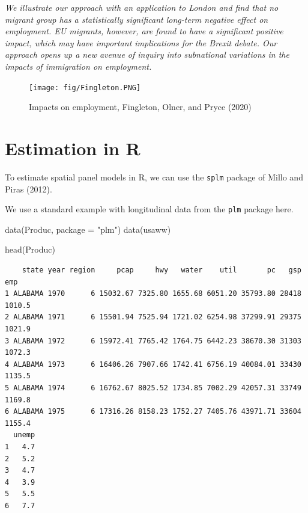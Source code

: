 \documentclass[
  letterpaper,
  DIV=11,
  numbers=noendperiod]{scrreprt}
\newenvironment{Shaded}{\begin{snugshade}}{\end{snugshade}}
\newcommand{\AttributeTok}[1]{\textcolor[rgb]{0.40,0.45,0.13}{#1}}
\newcommand{\FunctionTok}[1]{\textcolor[rgb]{0.28,0.35,0.67}{#1}}
\newcommand{\NormalTok}[1]{\textcolor[rgb]{0.00,0.23,0.31}{#1}}
\newcommand{\StringTok}[1]{\textcolor[rgb]{0.13,0.47,0.30}{#1}}
\begin{document}
\emph{We illustrate our approach with an application to London and find
that no migrant group has a statistically significant long-term negative
effect on employment. EU migrants, however, are found to have a
significant positive impact, which may have important implications for
the Brexit debate. Our approach opens up a new avenue of inquiry into
subnational variations in the impacts of immigration on employment.}

\begin{figure}

{\centering \texttt{[image: fig/Fingleton.PNG]}

}

\caption{Impacts on employment, Fingleton, Olner, and Pryce (2020)}

\end{figure}

\hypertarget{estimation-in-r}{%
\section{Estimation in R}\label{estimation-in-r}}

To estimate spatial panel models in R, we can use the \texttt{splm}
package of Millo and Piras (2012).

We use a standard example with longitudinal data from the \texttt{plm}
package here.

\begin{Shaded}
\begin{Highlighting}[]
\FunctionTok{data}\NormalTok{(Produc, }\AttributeTok{package =} \StringTok{"plm"}\NormalTok{)}
\FunctionTok{data}\NormalTok{(usaww)}

\FunctionTok{head}\NormalTok{(Produc)}
\end{Highlighting}
\end{Shaded}

\begin{verbatim}
    state year region     pcap     hwy   water    util       pc   gsp    emp
1 ALABAMA 1970      6 15032.67 7325.80 1655.68 6051.20 35793.80 28418 1010.5
2 ALABAMA 1971      6 15501.94 7525.94 1721.02 6254.98 37299.91 29375 1021.9
3 ALABAMA 1972      6 15972.41 7765.42 1764.75 6442.23 38670.30 31303 1072.3
4 ALABAMA 1973      6 16406.26 7907.66 1742.41 6756.19 40084.01 33430 1135.5
5 ALABAMA 1974      6 16762.67 8025.52 1734.85 7002.29 42057.31 33749 1169.8
6 ALABAMA 1975      6 17316.26 8158.23 1752.27 7405.76 43971.71 33604 1155.4
  unemp
1   4.7
2   5.2
3   4.7
4   3.9
5   5.5
6   7.7
\end{verbatim}
\end{document}
